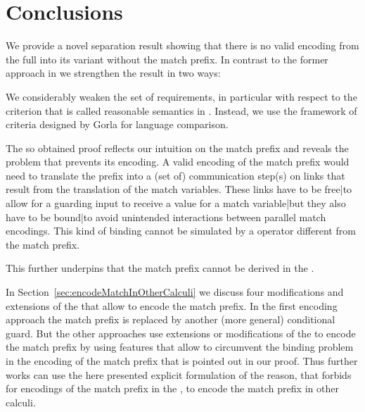 \documentclass[final,copyright,creativecommons]{eptcs}
\begin{document}
\section{Conclusions}
\label{sec:conclusions}

We provide a novel separation result showing that there is no valid encoding from the full \piCal into its variant without the match prefix. In contrast to the former approach in \cite{carbone} we strengthen the result in two ways:
\begin{compactenum}
	\item We considerably weaken the set of requirements, in particular with respect to the criterion that is called reasonable semantics in \cite{carbone}. Instead, we use the framework of criteria designed by Gorla for language comparison.
	\item The so obtained proof reflects our intuition on the match prefix and reveals the problem that prevents its encoding. A valid encoding of the match prefix would need to translate the prefix into a (set of) communication step(s) on links that result from the translation of the match variables. These links have to be free|to allow for a guarding input to receive a value for a match variable|but they also have to be bound|to avoid unintended interactions between parallel match encodings. This kind of binding cannot be simulated by a \piCal operator different from the match prefix.
\end{compactenum}
This further underpins that the match prefix cannot be derived in the \piCal.

In Section~\ref{sec:encodeMatchInOtherCalculi} we discuss four modifications and extensions of the \piCal that allow to encode the match prefix. 
In the first encoding approach the match prefix is replaced by another (more general) conditional guard. But the other approaches use extensions or modifications of the \piCal to encode the match prefix by using features that allow to circumvent the binding problem in the encoding of the match prefix that is pointed out in our proof.
Thus further works can use the here presented explicit formulation of the reason, that forbids for encodings of the match prefix in the \piCal, to encode the match prefix in other calculi.



\end{document}
